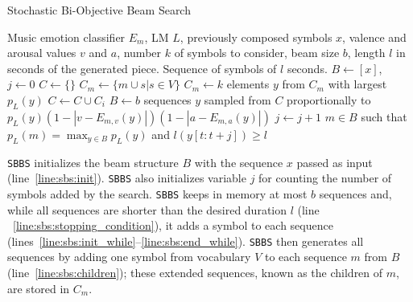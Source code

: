 \begin{algorithm}[t]
\caption{Stochastic Bi-Objective Beam Search}
\label{alg:sbs}
\begin{algorithmic}[1]
\REQUIRE Music emotion classifier $E_m$, LM $L$, previously composed symbols $x$, valence and arousal values $v$ and $a$, number $k$ of symbols to consider, beam size $b$, length $l$ in seconds of the generated piece.
\ENSURE Sequence of symbols of $l$ seconds.
\STATE $B \gets [x]$, $j \gets 0$ \label{line:sbs:init}
{} \label{line:sbs:stopping_condition}
    \STATE $C \gets \{\}$ \label{line:sbs:init_while}
        \STATE $C_m \gets \{m \cup s \vert s \in V\}$ \label{line:sbs:children}
        \STATE $C_m \gets k$ elements $y$ from $C_m$ with largest $p_L(y)$ \label{line:sbs:pruning_model}
        \STATE $C \gets C \cup C_i$ \label{line:sbs:total_children}
    \ENDFOR
    \STATE $B \gets b$ sequences $y$ sampled from $C$ proportionally to $p_L(y) (1 - |v - E_{m,v}(y)|) (1 - |a - E_{m,a}(y)|)$ \label{line:sbs:sample_next_beam}
    \STATE $j \gets j + 1$ \label{line:sbs:end_while}
\ENDWHILE
\RETURN $m \in B$ such that $p_L(m) = \max_{y \in B}p_L(y)$ and $l(y[t: t+j]) \geq l$ \label{line:sbs:return}
\end{algorithmic}
\end{algorithm}

\texttt{SBBS} initializes the beam structure $B$ with the sequence $x$ passed as input (line~\ref{line:sbs:init}).
\texttt{SBBS} also initializes variable $j$ for counting the number of symbols added by the search. \texttt{SBBS} keeps in memory at most $b$ sequences and, while all sequences are shorter than the desired duration $l$ (line
~\ref{line:sbs:stopping_condition}), it adds a symbol to each sequence (lines~\ref{line:sbs:init_while}--\ref{line:sbs:end_while}). \texttt{SBBS} then generates all sequences by adding one symbol from vocabulary $V$ to each sequence $m$ from $B$ (line~\ref{line:sbs:children}); these extended sequences, known as the children of $m$, are stored in $C_m$.

